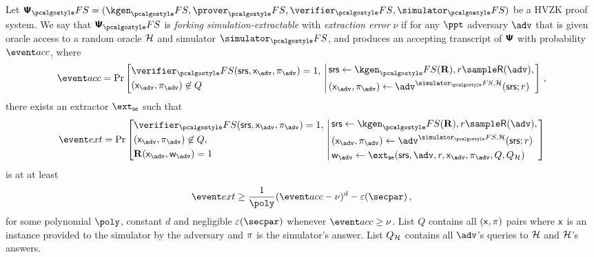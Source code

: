 \documentclass[runningheads,11pt]{llncs}
\begin{document}
\begin{definition}
	\label{def:simext}
  Let $\ps_\fs = (\kgen_\fs, \prover_\fs, \verifier_\fs, \simulator_\fs)$ be a
  HVZK proof system. We say that $\ps_\fs$ is \emph{forking
    simulation-extractable} with \emph{extraction error} $\nu$ if for any $\ppt$
  adversary $\adv$ that is given oracle access to a random oracle $\mathcal{H}$ and
  simulator $\simulator_\fs$, and produces an accepting transcript of $\bm{\mathsf{\Psi}}$ with
  probability $\accProb$, where
	\[
		\accProb = \Pr \left[
		\begin{aligned}
			& \verifier_\fs(\srs, \inp_{\advse}, \zkproof_{\advse}) = 1,\\
			& (\inp_{\advse}, \zkproof_{\advse}) \not\in Q
		\end{aligned}
		\, \left| \,
		\begin{aligned}
			& \srs \gets \kgen_\fs(\REL), r \sample \RND{\advse}, \\
			& (\inp_{\advse}, \zkproof_{\advse}) \gets \advse^{\simulator_\fs,
			\ro} (\srs; r)
		\end{aligned}
		\right.\right]\,,
	\]
	there exists an extractor $\extse$ such that
	\[
		\extProb = \Pr \left[
		\begin{aligned}
			& \verifier_\fs(\srs, \inp_{\advse}, \zkproof_{\advse}) = 1,\\
			& (\inp_{\advse}, \zkproof_{\advse}) \not\in Q,\\
			& \REL(\inp_{\advse}, \wit_{\advse}) = 1
		\end{aligned}
		\, \left| \,
		\begin{aligned}
			& \srs \gets \kgen_\fs(\REL), r \sample \RND{\advse},\\
			& (\inp_{\advse}, \zkproof_{\advse}) \gets \advse^{\simulator_\fs,
			\ro} (\srs; r) \\
			& \wit_{\advse} \gets \ext_\se (\srs, \advse, r, \inp_{\advse}, \zkproof_{\advse},
			Q, Q_\ro) 
		\end{aligned}
		\right.\right]
	\]
	is at at least 
	\[
		\extProb \geq \frac{1}{\poly} (\accProb - \nu)^d - \eps(\secpar)\,,
	\]
	for some polynomial $\poly$, constant $d$ and negligible $\eps(\secpar)$ whenever
  $\accProb \geq \nu$. List $Q$ contains all $(\mathsf{x}, \pi)$ pairs where
  $\mathsf{x}$ is an instance provided to the simulator by the adversary and
  $\pi$ is the simulator's answer. List $Q_{\mathcal{H}}$ contains all $\advse$'s
  queries to $\mathcal{H}$ and $\mathcal{H}$'s answers.
\end{definition}
\end{document}
